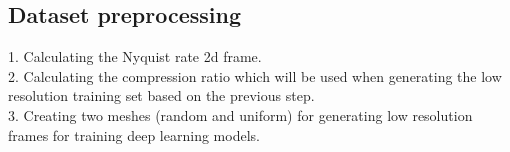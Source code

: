 \subsection{Dataset preprocessing}

1. Calculating the Nyquist rate 2d frame. \\
2. Calculating the compression ratio which will be used when generating the low resolution training set based on the previous step. \\
3. Creating two meshes (random and uniform) for generating low resolution frames for training deep learning models.\\